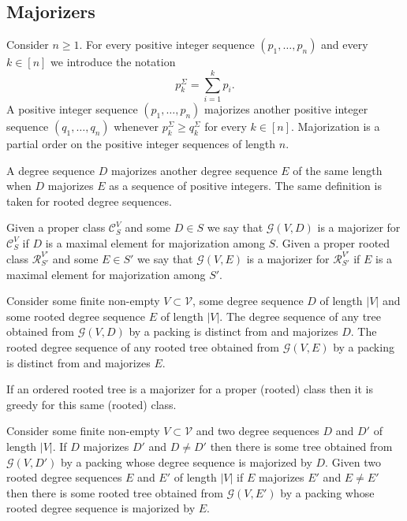 \documentclass[11 pt]{modarticle}
\newcommand{\vset}{\mathcal{V}}
\newcommand{\size}[1]{|#1|}
\newcommand{\tclass}{\mathcal{C}}
\newcommand{\rtclass}{\mathcal{R}}
\newcommand{\greedy}[2]{\mathcal{G}(#1,#2)}
\newcommand{\pclass}[2]{\tclass^{#1}_{#2}}
\newcommand{\rpclass}[2]{\rtclass^{#1}_{#2}}
\begin{document}
\subsection{Majorizers}\label{section:majorization}

Consider $n \geq 1$. For every positive integer sequence $(p_1, \dots, p_n)$ and every $k \in [n]$ we introduce the notation
\begin{equation*}
	p^{\Sigma}_k = \underset{i=1}{\overset{k}{\sum}} p_i.
\end{equation*}
A positive integer sequence $(p_1, \dots, p_n)$ majorizes another positive integer sequence $(q_1, \dots, q_n)$ whenever $p^{\Sigma}_k \geq q^{\Sigma}_k$ for every $k \in [n]$. Majorization is a partial order on the positive integer sequences of length $n$. 

A degree sequence $D$ majorizes another degree sequence $E$ of the same length when $D$ majorizes $E$ as a sequence of positive integers. The same definition is taken for rooted degree sequences.

\begin{defi}
Given a proper class $\pclass{V}{S}$ and some $D \in S$ we say that $\greedy{V}{D}$ is a majorizer for $\pclass{V}{S}$ if $D$ is a maximal element for majorization among $S$. Given a proper rooted class $\rpclass{V'}{S'}$ and some $E \in S'$ we say that $\greedy{V}{E}$ is a majorizer for $\rpclass{V'}{S'}$ if $E$ is a maximal element for majorization among $S'$.
\end{defi}

\begin{rem}\label{rem:majorization}
Consider some finite non-empty $V \subset \vset$, some degree sequence $D$ of length $\size{V}$ and some rooted degree sequence $E$ of length $\size{V}$. The degree sequence of any tree obtained from $\greedy{V}{D}$ by a packing is distinct from and majorizes $D$. The rooted degree sequence of any rooted tree obtained from $\greedy{V}{E}$ by a packing is distinct from and majorizes $E$. 
\end{rem}

\begin{cor}\label{cor:majorization}
If an ordered rooted tree is a majorizer for a proper (rooted) class then it is greedy for this same (rooted) class.
\end{cor}

\begin{prop}\label{prop:majorization}
Consider some finite non-empty $V \subset \vset$ and two degree sequences $D$ and $D'$ of length $\size{V}$. If $D$ majorizes $D'$ and $D \neq D'$ then there is some tree obtained from $\greedy{V}{D'}$ by a packing whose degree sequence is majorized by $D$. Given two rooted degree sequences $E$ and $E'$ of length $\size{V}$ if $E$ majorizes $E'$ and $E \neq E'$ then there is some rooted tree obtained from $\greedy{V}{E'}$ by a packing whose rooted degree sequence is majorized by $E$.
\end{prop}
\end{document}
